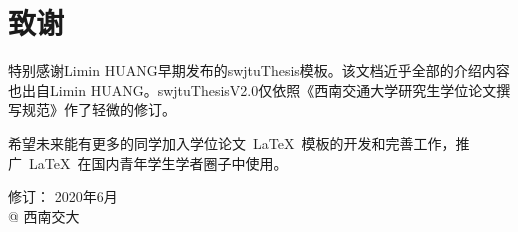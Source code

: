 \chapter*{致\qquad{}谢}

特别感谢Limin HUANG早期发布的swjtuThesis模板。该文档近乎全部的介绍内容也出自Limin HUANG。swjtuThesisV2.0仅依照《西南交通大学研究生学位论文撰写规范》作了轻微的修订。

\par
希望未来能有更多的同学加入学位论文~\LaTeX{}~模板的开发和完善工作，推广~\LaTeX{}~在国内青年学生学者圈子中使用。

\vspace{25mm}
\begin{flushright}
	修订： 2020年6月 \\
	@ 西南交大
\end{flushright}
